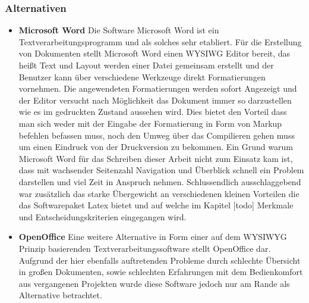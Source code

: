 \subsubsection{Alternativen}
\begin{itemize}
\item \textbf{Microsoft Word}
Die Software Microsoft Word ist ein Textverarbeitungsprogramm und als solches sehr etabliert. Für die Erstellung von Dokumenten stellt Microsoft Word einen WYSIWG Editor bereit, das heißt Text und Layout werden einer Datei gemeinsam erstellt und der Benutzer kann über verschiedene Werkzeuge direkt Formatierungen vornehmen. Die angewendeten Formatierungen werden sofort Angezeigt und der Editor versucht nach Möglichkeit das Dokument immer so darzustellen wie es im gedruckten Zustand aussehen wird. Dies bietet den Vorteil dass man sich weder mit der Eingabe der Formatierung in Form von Markup befehlen befassen muss, noch den Umweg über das Compilieren gehen muss um einen Eindruck von der Druckversion zu bekommen.
Ein Grund warum Microsoft Word für das Schreiben dieser Arbeit nicht zum Einsatz kam ist, dass mit wachsender Seitenzahl Navigation und Überblick schnell ein Problem darstellen und viel Zeit in Anspruch nehmen. Schlussendlich ausschlaggebend war zusätzlich das starke Übergewicht an verschiedenen kleinen Vorteilen die das Softwarepaket Latex bietet und auf welche im Kapitel [todo] Merkmale und Entscheidungskriterien eingegangen wird.
\item \textbf{OpenOffice}
Eine weitere Alternative in Form einer auf dem WYSIWYG Prinzip basierenden Textverarbeitungssoftware stellt OpenOffice dar. Aufgrund der hier ebenfalls auftretenden Probleme durch schlechte Übersicht in großen Dokumenten, sowie schlechten Erfahrungen mit dem Bedienkomfort aus vergangenen Projekten wurde diese Software jedoch nur am Rande als Alternative betrachtet.
\end{itemize}